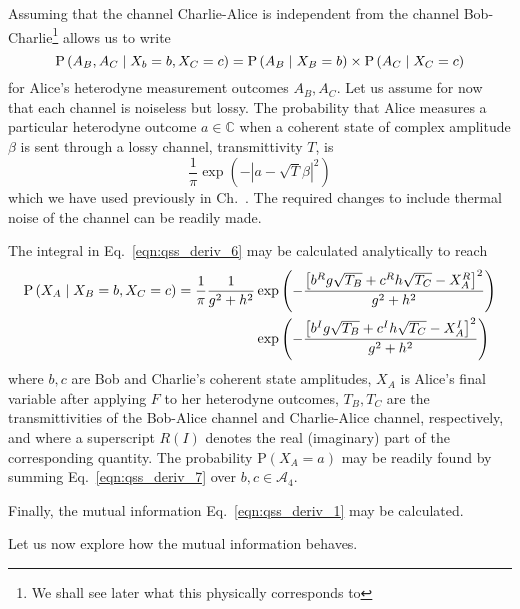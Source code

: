 Assuming that the channel Charlie-Alice is independent from the channel Bob-Charlie\footnote{We shall see later what this physically corresponds to} allows us to write
\begin{equation}\label{eqn:qss_deriv_6}
\text{P}\left(A_B, A_C \; \middle| \; X_b=b, X_C=c\right) = \text{P}\left(A_B \; \middle| \; X_B=b\right) \times \text{P}\left(A_C \; \middle| \; X_C=c\right)
\end{equation}
for Alice's heterodyne measurement outcomes $A_B, A_C$. Let us assume for now that each channel is noiseless but lossy. The probability that Alice measures a particular heterodyne outcome $a \in \mathbb{C}$ when a coherent state of complex amplitude $\beta$ is sent through a lossy channel, transmittivity $T$, is 
\begin{equation}
\frac{1}{\pi}\exp\left( - \left| a - \sqrt{T}\beta \right|^2\right)
\end{equation}
which we have used previously in Ch.~. The required changes to include thermal noise of the channel can be readily made.

The integral in Eq.~\ref{eqn:qss_deriv_6} may be calculated analytically to reach 
\begin{align}\label{eqn:qss_deriv_7}
\text{P}\left(X_A \given X_B=b, X_C=c\right) = \frac{1}{\pi} \frac{1}{g^2 + h^2} &\exp \left( - \frac{\left[b^R g \sqrt{T_B} + c^R h \sqrt{T_C} - X_A^R \right]^2}{g^2 + h^2}\right) \notag \\
%
&\exp \left( - \frac{\left[b^I g \sqrt{T_B} + c^I h \sqrt{T_C} - X_A^I \right]^2}{g^2 + h^2} \right)
\end{align}
where $b, c$ are Bob and Charlie's coherent state amplitudes, $X_A$ is Alice's final variable after applying $F$ to her heterodyne outcomes, $T_B, T_C$ are the transmittivities of the Bob-Alice channel and Charlie-Alice channel, respectively, and where a superscript $R\left(I\right)$ denotes the real (imaginary) part of the corresponding quantity.  The probability $\text{P}\left(X_A=a\right)$ may be readily found by summing Eq.~\ref{eqn:qss_deriv_7} over $b, c \in \mathcal{A}_4$. 

Finally, the mutual information Eq.~\ref{eqn:qss_deriv_1} may be calculated. 

Let us now explore how the mutual information behaves. 

